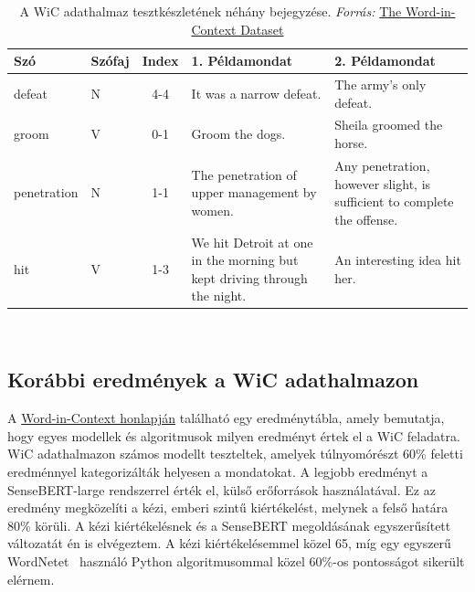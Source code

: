 \documentclass[12pt]{report}
\begin{document}
    \begin{table}[H]
        \centering
        \label{tab:wic_peldak} %
        \begin{tabular}{llcp{}p{}} %
            \hline
            \textbf{Szó} & \textbf{Szófaj} & \textbf{Index} & \textbf{1. Példamondat}                                                  & \textbf{2. Példamondat}                                                 \\
            \hline
            defeat       & N               & 4-4            & It was a narrow defeat.                                                  & The army's only defeat.                                                 \\
            groom        & V               & 0-1            & Groom the dogs.                                                          & Sheila groomed the horse.                                               \\
            penetration  & N               & 1-1            & The penetration of upper management by women.                            & Any penetration, however slight, is sufficient to complete the offense. \\
            hit          & V               & 1-3            & We hit Detroit at one in the morning but kept driving through the night. & An interesting idea hit her.                                         \\
            \hline
        \end{tabular}
        \caption{A WiC adathalmaz tesztkészletének néhány bejegyzése. \textit{ Forrás:} \href{https://pilehvar.github.io/wic/}{The Word-in-Context Dataset}}~\cite{pilehvar2019wic}
    \end{table}

    \subsection{Korábbi eredmények a WiC adathalmazon}
    A \href{https://pilehvar.github.io/wic/}{Word-in-Context honlapján} található egy eredménytábla, amely bemutatja, hogy egyes modellek és algoritmusok milyen eredményt értek el a WiC feladatra.
    WiC adathalmazon számos modellt teszteltek, amelyek túlnyomórészt 60\% feletti eredménnyel kategorizálták helyesen a mondatokat.
    A legjobb eredményt a SenseBERT-large rendszerrel érték el, külső erőforrások használatával. Ez az eredmény megközelíti a kézi, emberi szintű kiértékelést, melynek a felső határa 80\% körüli.
    A kézi kiértékelésnek és a SenseBERT megoldásának egyszerűsített változatát én is elvégeztem.
    A kézi kiértékelésemmel közel 65, míg egy egyszerű WordNetet~\cite{miller1994wordnet} használó Python algoritmusommal közel 60\%-os pontosságot sikerült elérnem.
\end{document}

